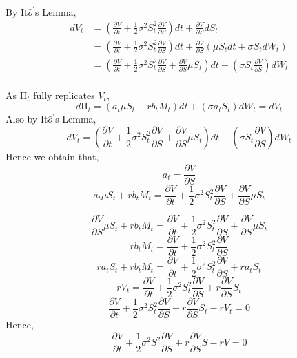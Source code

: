 \begin{center}
By It$\hat{o}^{\prime}$s Lemma, 
\begin{equation*}
\begin{split}
dV_{t}
&= (\frac{\partial V}{\partial t}+\frac{1}{2}\sigma^{2}S_{t}^{2}\frac{\partial V}{\partial S})dt + \frac{\partial V}{\partial S}dS_{t}\\
&= (\frac{\partial V}{\partial t}+\frac{1}{2}\sigma^{2}S_{t}^{2}\frac{\partial V}{\partial S})dt + \frac{\partial V}{\partial S}(\mu S_{t}dt + \sigma S_{t}dW_{t})\\
&= (\frac{\partial V}{\partial t}+\frac{1}{2}\sigma^{2}S_{t}^{2}\frac{\partial V}{\partial S}+\frac{\partial V}{\partial S}\mu S_{t})dt + (\sigma S_{t}\frac{\partial V}{\partial S})dW_{t}\\
\end{split}
\end{equation*}
\end{center}

\begin{center}
As $\mathrm{\Pi}_{t}$ fully replicates $V_{t}$,
$$d\mathrm{\Pi}_{t} = (a_{t}\mu S_{t} + rb_{t}M_{t})dt + (\sigma a_{t}S_{t})dW_{t} = dV_{t}$$
Also by It$\hat{o}^{\prime}$s Lemma, 
$$dV_{t} = (\frac{\partial V}{\partial t}+\frac{1}{2}\sigma^{2}S_{t}^{2}\frac{\partial V}{\partial S}+\frac{\partial V}{\partial S}\mu S_{t})dt + (\sigma S_{t}\frac{\partial V}{\partial S})dW_{t}$$
Hence we obtain that,
$$a_{t} = \frac{\partial V}{\partial S}$$
$$a_{t}\mu S_{t} + rb_{t}M_{t} = \frac{\partial V}{\partial t}+\frac{1}{2}\sigma^{2}S_{t}^{2}\frac{\partial V}{\partial S}+\frac{\partial V}{\partial S}\mu S_{t}$$
\end{center}

\begin{center}
$$\frac{\partial V}{\partial S}\mu S_{t} + rb_{t}M_{t} = \frac{\partial V}{\partial t}+\frac{1}{2}\sigma^{2}S_{t}^{2}\frac{\partial V}{\partial S}+\frac{\partial V}{\partial S}\mu S_{t}$$
$$rb_{t}M_{t} = \frac{\partial V}{\partial t}+\frac{1}{2}\sigma^{2}S_{t}^{2}\frac{\partial V}{\partial S}$$
$$ra_{t}S_{t}+rb_{t}M_{t} = \frac{\partial V}{\partial t}+\frac{1}{2}\sigma^{2}S_{t}^{2}\frac{\partial V}{\partial S}+ra_{t}S_{t}$$
$$rV_{t} = \frac{\partial V}{\partial t}+\frac{1}{2}\sigma^{2}S_{t}^{2}\frac{\partial V}{\partial S}+r\frac{\partial V}{\partial S}S_{t}$$
$$\frac{\partial V}{\partial t}+\frac{1}{2}\sigma^{2}S_{t}^{2}\frac{\partial V}{\partial S}+r\frac{\partial V}{\partial S}S_{t}- rV_{t} = 0$$
Hence,
$$\frac{\partial V}{\partial t}+\frac{1}{2}\sigma^{2}S^{2}\frac{\partial V}{\partial S}+r\frac{\partial V}{\partial S}S- rV = 0$$
\end{center}
\newpage

